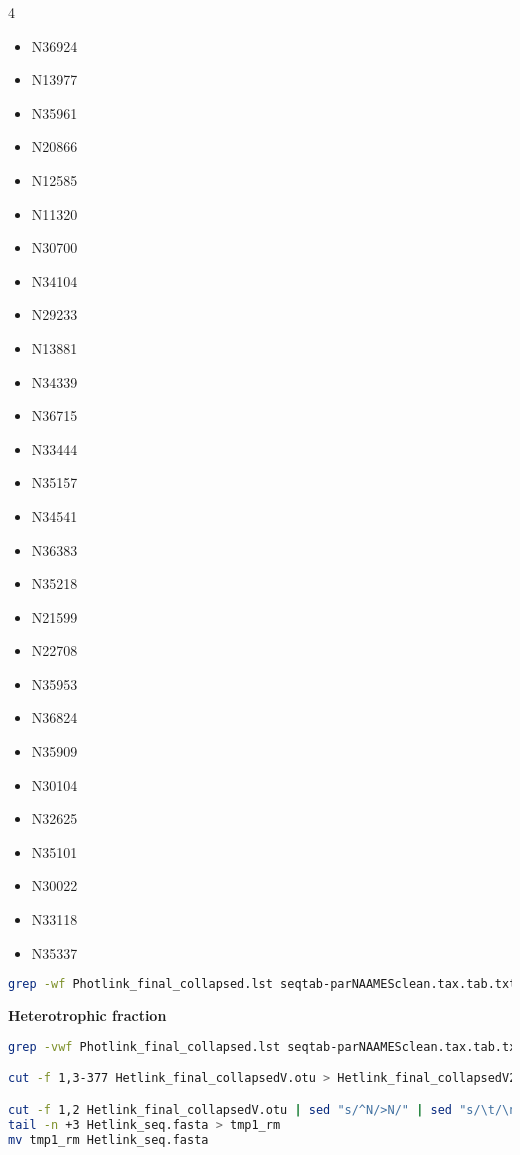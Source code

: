 \documentclass{article}
\begin{document}
\begin{itemize}
\begin{multicols}{4}
    \begin{itemize}
\item N36924
\item N13977
\item N35961
\item N20866
\item N12585
\item N11320
\item N30700
\item N34104
\item N29233
\item N13881
\item N34339
\item N36715
\item N33444
\item N35157
\item N34541
\item N36383
\item N35218
\item N21599
\item N22708
\item N35953
\item N36824
\item N35909
\item N30104
\item N32625
\item N35101
\item N30022
\item N33118
\item N35337
\end{itemize}
    \end{multicols}
\begin{lstlisting}[language=bash]
grep -wf Photlink_final_collapsed.lst seqtab-parNAAMESclean.tax.tab.txt > Photlink_final_collapsedVR2.otu #This VR2 is the file without the above sequences
\end{lstlisting}

\centerline{\bfseries Heterotrophic fraction}
\begin{lstlisting}[language=bash]
grep -vwf Photlink_final_collapsed.lst seqtab-parNAAMESclean.tax.tab.txt > Hetlink_final_collapsedV.otu

cut -f 1,3-377 Hetlink_final_collapsedV.otu > Hetlink_final_collapsedV2.otu #Get the Heterotrophic ASV Table

cut -f 1,2 Hetlink_final_collapsedV.otu | sed "s/^N/>N/" | sed "s/\t/\n/g" > Hetlink_seq.fasta
tail -n +3 Hetlink_seq.fasta > tmp1_rm
mv tmp1_rm Hetlink_seq.fasta


\end{lstlisting}
\end{itemize}
\end{document}

